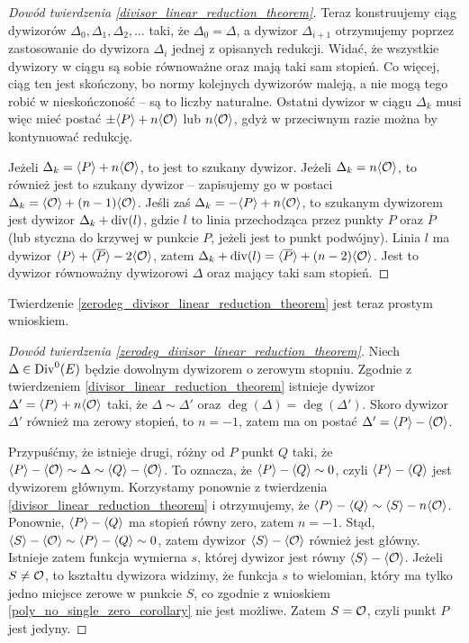 \begin{proof}[Dowód twierdzenia \ref{divisor_linear_reduction_theorem}]
Teraz konstruujemy ciąg dywizorów
$\Delta_0, \Delta_1, \Delta_2, \ldots$ taki,
że $\Delta_0 = \Delta$,
a dywizor $\Delta_{i+1}$ otrzymujemy
poprzez zastosowanie do dywizora $\Delta_i$ jednej z opisanych redukcji.
Widać, że wszystkie dywizory w ciągu są sobie równoważne
oraz mają taki sam stopień.
Co więcej, ciąg ten jest skończony,
bo normy kolejnych dywizorów maleją,
a nie mogą tego robić w nieskończoność -- są to liczby naturalne.
Ostatni dywizor w ciągu $\Delta_k$ musi więc mieć postać
$\pm\langle P\rangle + n\langle\mathcal{O}\rangle$ lub $n\langle\mathcal{O}\rangle$,
gdyż w przeciwnym razie można by kontynuować redukcję.

Jeżeli $\Delta_k = \langle P\rangle + n\langle\mathcal{O}\rangle$,
to jest to szukany dywizor.
Jeżeli $\Delta_k = n\langle\mathcal{O}\rangle$,
to również jest to szukany dywizor --
zapisujemy go w postaci $\Delta_k = \langle\mathcal{O}\rangle + (n-1)\langle\mathcal{O}\rangle$.
Jeśli zaś $\Delta_k = -\langle P\rangle + n\langle\mathcal{O}\rangle$,
to szukanym dywizorem jest dywizor
$\Delta_k + \operatorname{div}(l)$,
gdzie $l$ to linia przechodząca przez punkty $P$ oraz $\overline{P}$
(lub styczna do krzywej w punkcie $P$, jeżeli jest to punkt podwójny).
Linia $l$ ma dywizor $\langle P\rangle + \langle\overline{P}\rangle - 2\langle\mathcal{O}\rangle$,
zatem $\Delta_k + \operatorname{div}(l) = \langle\overline{P}\rangle + (n-2)\langle\mathcal{O}\rangle$.
Jest to dywizor równoważny dywizorowi $\Delta$ oraz mający taki sam stopień.
\end{proof}

Twierdzenie \ref{zerodeg_divisor_linear_reduction_theorem}
jest teraz prostym wnioskiem.

\begin{proof}[Dowód twierdzenia \ref{zerodeg_divisor_linear_reduction_theorem}]
Niech $\Delta \in \operatorname{Div}^0(E)$ będzie dowolnym dywizorem o zerowym stopniu.
Zgodnie z twierdzeniem \ref{divisor_linear_reduction_theorem}
istnieje dywizor $\Delta' = \langle P\rangle + n\langle\mathcal{O}\rangle$
taki, że $\Delta \sim \Delta'$ oraz $\deg(\Delta) = \deg(\Delta')$.
Skoro dywizor $\Delta'$ również ma zerowy stopień,
to $n = -1$, zatem ma on postać $\Delta' = \langle P\rangle - \langle\mathcal{O}\rangle$.

Przypuśćmy, że istnieje drugi, różny od $P$ punkt $Q$ taki,
że $\langle P\rangle - \langle\mathcal{O}\rangle \sim \Delta \sim \langle Q\rangle - \langle\mathcal{O}\rangle$.
To oznacza, że $\langle P\rangle - \langle Q\rangle \sim 0$,
czyli $\langle P\rangle - \langle Q\rangle$ jest dywizorem głównym.
Korzystamy ponownie z twierdzenia \ref{divisor_linear_reduction_theorem}
i otrzymujemy, że $\langle P\rangle - \langle Q\rangle \sim \langle S\rangle - n\langle\mathcal{O}\rangle$.
Ponownie, $\langle P\rangle - \langle Q\rangle$ ma stopień równy zero,
zatem $n = -1$.
Stąd, $\langle S\rangle - \langle\mathcal{O}\rangle \sim \langle P\rangle - \langle Q\rangle \sim 0$,
zatem dywizor $\langle S\rangle - \langle\mathcal{O}\rangle$ również jest główny.
Istnieje zatem funkcja wymierna $s$,
której dywizor jest równy $\langle S\rangle - \langle\mathcal{O}\rangle$.
Jeżeli $S \neq \mathcal{O}$,
to kształtu dywizora widzimy,
że funkcja $s$ to wielomian,
który ma tylko jedno miejsce zerowe w punkcie $S$,
co zgodnie z wnioskiem \ref{poly_no_single_zero_corollary}
nie jest możliwe.
Zatem $S = \mathcal{O}$, czyli punkt $P$ jest jedyny.
\end{proof}

